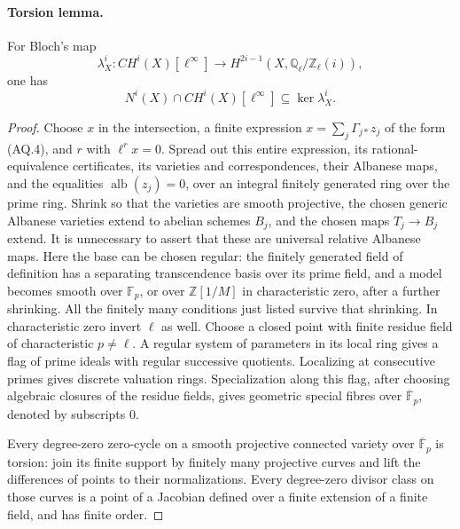\paragraph{Torsion lemma.}
For Bloch's map
\[
 \lambda_X^i:CH^i(X)[\ell^\infty]\longrightarrow
                    H^{2i-1}(X,\mathbb Q_\ell/\mathbb Z_\ell(i)),
\]
one has
\[
 N^i(X)\cap CH^i(X)[\ell^\infty]\subseteq\ker\lambda_X^i.          \tag{AQ.5}
\]
\begin{proof}
Choose $x$ in the intersection, a finite expression
$x=\sum_j\Gamma_{j*}z_j$ of the form (AQ.4), and $r$ with
$\ell^r x=0$. Spread out this entire expression, its
rational-equivalence certificates, its varieties and
correspondences, their Albanese maps, and the equalities
$\operatorname{alb}(z_j)=0$, over an integral finitely generated
ring over the prime ring. Shrink so that the varieties are
smooth projective, the chosen generic Albanese varieties extend
to abelian schemes $B_j$, and the chosen maps $T_j\to B_j$
extend. It is unnecessary to assert that these are universal
relative Albanese maps. Here the base can be chosen regular:
the finitely generated field of definition has a separating
transcendence basis over its prime field, and a model becomes
smooth over $\mathbb F_p$, or over $\mathbb Z[1/M]$ in
characteristic zero, after a further shrinking. All the
finitely many conditions just listed survive that shrinking.
In characteristic zero invert $\ell$ as well.
Choose a closed point with finite residue field of
characteristic $p\ne\ell$. A regular system of parameters
in its local ring gives a flag of prime ideals with regular
successive quotients. Localizing at consecutive primes
gives discrete valuation rings. Specialization along this
flag, after choosing algebraic closures of the residue
fields, gives geometric special fibres over
$\overline{\mathbb F}_p$, denoted by subscripts $0$.

Every degree-zero zero-cycle on a smooth projective connected
variety over $\overline{\mathbb F}_p$ is torsion: join its
finite support by finitely many projective curves and lift
the differences of points to their normalizations. Every
degree-zero divisor class on those curves is a point of a
Jacobian defined over a finite extension of a finite field,
and has finite order.


\end{proof}
